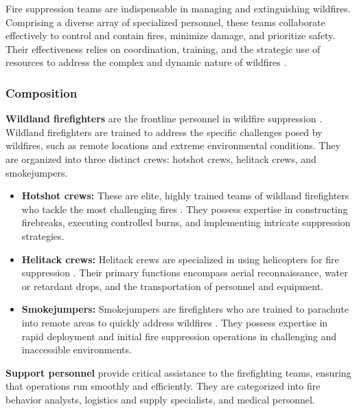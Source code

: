 \documentclass[
  12 pt,
]{Nemilov}
\begin{document}
Fire suppression teams are indispensable in managing and extinguishing wildfires. Comprising a diverse array of specialized personnel, these teams collaborate effectively to control and contain fires, minimize damage, and prioritize safety. Their effectiveness relies on coordination, training, and the strategic use of resources to address the complex and dynamic nature of wildfires \citep{mclennan2006decision}.

\subsubsection{Composition}\label{composition}

\textbf{Wildland firefighters} are the frontline personnel in wildfire suppression \citep{desmond2006becoming}. Wildland firefighters are trained to address the specific challenges posed by wildfires, such as remote locations and extreme environmental conditions. They are organized into three distinct crews: hotshot crews, helitack crews, and smokejumpers.

\begin{itemize}
\item
  \textbf{Hotshot crews:} These are elite, highly trained teams of wildland firefighters who tackle the most challenging fires \citep{bramwell2008hotshots}. They possess expertise in constructing firebreaks, executing controlled burns, and implementing intricate suppression strategies.
\item
  \textbf{Helitack crews:} Helitack crews are specialized in using helicopters for fire suppression \citep{page2019assessing}. Their primary functions encompass aerial reconnaissance, water or retardant drops, and the transportation of personnel and equipment.
\item
  \textbf{Smokejumpers:} Smokejumpers are firefighters who are trained to parachute into remote areas to quickly address wildfires \citep{beil1999fire, taylor2014jumping}. They possess expertise in rapid deployment and initial fire suppression operations in challenging and inaccessible environments.
\end{itemize}

\textbf{Support personnel} provide critical assistance to the firefighting teams, ensuring that operations run smoothly and efficiently. They are categorized into fire behavior analysts, logistics and supply specialists, and medical personnel.
\end{document}
